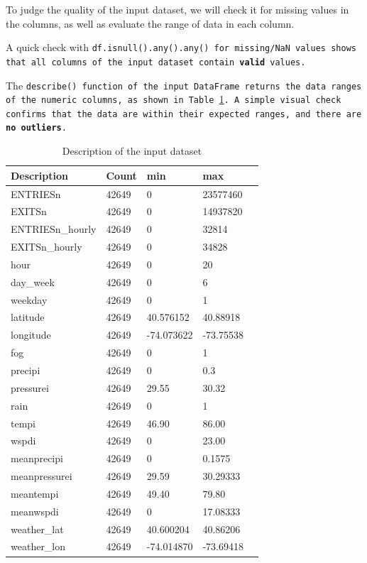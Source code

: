 \documentclass{article}
\begin{document}
To judge the quality of the input dataset, we will check it for missing values in the columns, as well as evaluate the range of data in each column.

A quick check with \tt df.isnull().any().any() \rm for missing/NaN values shows that all columns of the input dataset contain \textbf{valid} values. 

The \tt describe() \rm function of the input DataFrame returns the data ranges of the numeric columns, as shown in Table \ref{tab:input-set-describe}. A simple visual check confirms that the data are within their expected ranges, and there are \textbf{no outliers}.


\begin{table}[ht]
\centering
\begin{tabular}{l| llll}
\hline
Description      & Count &  min & max           \\
\hline
ENTRIESn         & 42649 &  0   & 23577460  \\
EXITSn           & 42649 &  0   & 14937820  \\
ENTRIESn\_hourly & 42649 &  0   & 32814  \\
EXITSn\_hourly   & 42649 &  0   & 34828  \\
hour             & 42649 &  0   & 20  \\
day\_week        & 42649 &  0   & 6  \\
weekday          & 42649 &  0   & 1  \\
latitude         & 42649 &  40.576152  & 40.88918  \\
longitude        & 42649 &  -74.073622 & -73.75538 \\
fog              & 42649 &  0   & 1  \\
precipi          & 42649 &  0   & 0.3  \\
pressurei        & 42649 &  29.55  & 30.32  \\
rain             & 42649 &  0   & 1  \\
tempi            & 42649 &  46.90  & 86.00  \\
wspdi            & 42649 &  0   & 23.00  \\
meanprecipi      & 42649 &  0   & 0.1575  \\
meanpressurei    & 42649 &  29.59 & 30.29333  \\
meantempi        & 42649 &  49.40  & 79.80  \\
meanwspdi        & 42649 &  0   & 17.08333  \\
weather\_lat     & 42649 &  40.600204  & 40.86206  \\
weather\_lon     & 42649 &  -74.014870 & -73.69418 \\
\hline
\end{tabular}
\caption{Description of the input dataset}
\label{tab:input-set-describe}
\end{table}
\end{document}
